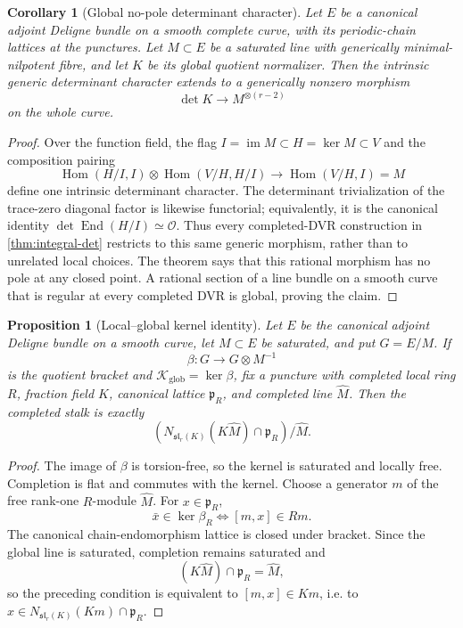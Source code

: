 \documentclass[11pt]{article}
\newtheorem{proposition}[theorem]{Proposition}
\newtheorem{corollary}[theorem]{Corollary}
\theoremstyle{definition}
\newcommand{\Ocal}{\mathcal O}
\newcommand{\Kcal}{\mathcal K}
\newcommand{\im}{\operatorname{im}}
\newcommand{\Hom}{\operatorname{Hom}}
\newcommand{\End}{\operatorname{End}}
\begin{document}
\begin{corollary}[Global no-pole determinant character]
\label{cor:global-integral-det}
Let $E$ be a canonical adjoint Deligne bundle on a smooth complete curve,
with its periodic-chain lattices at the punctures.  Let $M\subset E$ be a
saturated line with generically minimal-nilpotent fibre, and let $K$ be its
global quotient normalizer.  Then the intrinsic generic determinant
character extends to a generically nonzero morphism
\[
 \det K\longrightarrow M^{\otimes(r-2)}
\]
on the whole curve.
\end{corollary}

\begin{proof}
Over the function field, the flag
$I=\im M\subset H=\ker M\subset V$ and the composition pairing
\[
 \Hom(H/I,I)\otimes\Hom(V/H,H/I)\longrightarrow\Hom(V/H,I)=M
\]
define one intrinsic determinant character.  The determinant
trivialization of the trace-zero diagonal factor is likewise functorial;
equivalently, it is the canonical identity
$\det\End(H/I)\simeq\Ocal$.  Thus every completed-DVR construction in
\cref{thm:integral-det} restricts to this same generic morphism, rather than
to unrelated local choices.  The theorem says that this rational morphism
has no pole at any closed point.  A rational section of a line bundle on a
smooth curve that is regular at every completed DVR is global, proving the
claim.
\end{proof}

\begin{proposition}[Local--global kernel identity]
\label{prop:kernel-compatibility}
Let $E$ be the canonical adjoint Deligne bundle on a smooth curve, let
$M\subset E$ be saturated, and put $G=E/M$.  If
\[
 \beta:G\longrightarrow G\otimes M^{-1}
\]
is the quotient bracket and $\Kcal_{\mathrm{glob}}=\ker\beta$, fix a puncture
with completed local ring $R$, fraction field $K$, canonical lattice
$\mathfrak p_R$, and completed line $\widehat M$.  Then the completed stalk
is exactly
\[
 \left(N_{\mathfrak{sl}_r(K)}(K\widehat M)\cap\mathfrak p_R\right)/\widehat M.
\]
\end{proposition}

\begin{proof}
The image of $\beta$ is torsion-free, so the kernel is saturated and locally
free.  Completion is flat and commutes with the kernel.  Choose a generator
$m$ of the free rank-one $R$-module $\widehat M$.  For
$x\in\mathfrak p_R$,
\[
 \bar x\in\ker\beta_R
 \Longleftrightarrow [m,x]\in Rm.
\]
The canonical chain-endomorphism lattice is closed under bracket.  Since the
global line is saturated, completion remains saturated and
\[
 (K\widehat M)\cap\mathfrak p_R=\widehat M,
\]
so the preceding condition is equivalent to $[m,x]\in Km$, i.e. to
$x\in N_{\mathfrak{sl}_r(K)}(Km)\cap\mathfrak p_R$.
\end{proof}
\end{document}
